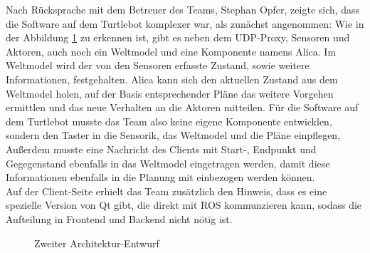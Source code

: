 \documentclass[a4paper,12pt,headsepline]{scrartcl}
\begin{document}
		Nach Rücksprache mit dem Betreuer des Teams, Stephan Opfer, zeigte sich, dass die Software auf dem Turtlebot komplexer war, als zunächst angenommen: Wie in der Abbildung \ref{fig:arch02} zu erkennen ist, gibt es neben dem UDP-Proxy, Sensoren und Aktoren, auch noch ein Weltmodel und eine Komponente namens \glqq Alica\grqq . Im Weltmodel wird der von den Sensoren erfasste Zustand, sowie weitere Informationen, festgehalten. Alica kann sich den aktuellen Zustand aus dem Weltmodel holen, auf der Basis entsprechender Pläne das weitere Vorgehen ermittlen und das neue Verhalten an die Aktoren mitteilen. Für die Software auf dem Turtlebot musste das Team also keine eigene Komponente entwicklen, sondern den Taster in die Sensorik, das Weltmodel und die Pläne einpflegen, Außerdem musste eine Nachricht des Clients mit Start-, Endpunkt und Gegegenstand ebenfalls in das Weltmodel eingetragen werden, damit diese Informationen ebenfalls in die Planung mit einbezogen werden können. \\
		Auf der Client-Seite erhielt das Team zusätzlich den Hinweis, dass es eine spezielle Version von Qt gibt, die direkt mit ROS kommunzieren kann, sodass die Aufteilung in Frontend und Backend nicht nötig ist.
		\begin{figure}[H]
			\centering
			\resizebox{\textwidth}{!}{}
			\caption{Zweiter Architektur-Entwurf}
			\label{fig:arch02}
		\end{figure}
		
\end{document}
